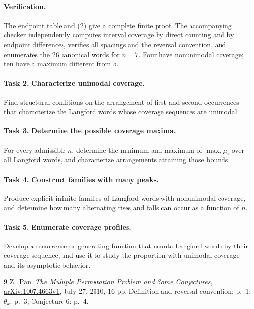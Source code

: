 \documentclass[11pt]{article}
\begin{document}
\paragraph{Verification.}
The endpoint table and (2) give a complete finite proof.
The accompanying checker independently computes interval coverage
by direct counting and by endpoint differences, verifies all
spacings and the reversal convention, and enumerates the \(26\)
canonical words for \(n=7\). Four have nonunimodal coverage;
ten have a maximum different from \(5\).

\newpage
\paragraph{Task 2. Characterize unimodal coverage.}
Find structural conditions on the arrangement of first and second
occurrences that characterize the Langford words whose coverage
sequences are unimodal.

\paragraph{Task 3. Determine the possible coverage maxima.}
For every admissible \(n\), determine the minimum and maximum of
\(\max_i\mu_i\) over all Langford words, and characterize arrangements
attaining those bounds.

\paragraph{Task 4. Construct families with many peaks.}
Produce explicit infinite families of Langford words with
nonunimodal coverage, and determine how many alternating rises
and falls can occur as a function of \(n\).

\paragraph{Task 5. Enumerate coverage profiles.}
Develop a recurrence or generating function that counts Langford
words by their coverage sequence, and use it to study the proportion
with unimodal coverage and its asymptotic behavior.

\begin{thebibliography}{9}
Z.~Pan, \emph{The Multiple Permutation Problem and Some Conjectures},
\href{https://arxiv.org/abs/1007.4663}{arXiv:1007.4663v1},
July 27, 2010, 16 pp.
Definition and reversal convention: p.~1; \(\theta_k\): p.~3;
Conjecture 6: p.~4.
\end{thebibliography}
\end{document}

